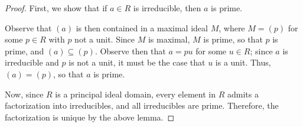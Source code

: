 \documentclass[10pt]{mypackage}
\begin{document}
\begin{proof}
  First, we show that if $a\in R$ is irreducible, then $a$ is prime.\newline

  Observe that $\left( a \right)$ is then contained in a maximal ideal $M$, where $M = \left( p \right)$ for some $p\in R$ with $p$ not a unit. Since $M$ is maximal, $M$ is prime, so that $p$ is prime, and $\left( a \right)\subseteq \left( p \right)$. Observe then that $a = pu$ for some $u\in R$; since $a$ is irreducible and $p$ is not a unit, it must be the case that $u$ is a unit. Thus, $\left( a \right) = \left( p \right)$, so that $a$ is prime.\newline

  Now, since $R$ is a principal ideal domain, every element in $R$ admits a factorization into irreducibles, and all irreducibles are prime. Therefore, the factorization is unique by the above lemma.
\end{proof}
\end{document}
